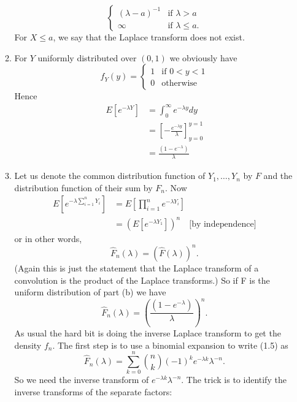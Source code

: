 \documentclass[11pt,a4paper]{article}
\begin{document}
\begin{enumerate}
\begin{enumerate}
$$\begin{cases}
        (\lambda - a)^{-1} & \text{if $\lambda > a$}\\
        \infty & \text{if $\lambda \leq a$}.
      \end{cases}
      $$
      For $X \leq a$, we say that the Laplace transform does not exist.
      \item For $Y$ uniformly distributed over $(0, 1)$ we obviously have
      \begin{equation}\tag{1.4}
        f_Y(y) =
        \begin{cases}
          1 & \text{if $0 < y < 1$}\\
          0 & \text{otherwise}
        \end{cases}
      \end{equation}
      Hence
      \begin{align*}
        E[e^{-\lambda Y}]
        &= \int_0^\infty e^{-\lambda y}dy\\
        &= \left[-\frac{e^{-\lambda y}}{\lambda}\right]^{y = 1}_{y = 0}\\
        &= \frac{(1 - e^{-\lambda})}{\lambda}
      \end{align*}
      \item Let us denote the common distribution function of $Y_1, \ldots, Y_n$ by $F$ and the distribution
      function of their sum by $F_n$. Now
      \begin{align*}
        E\left[e^{-\lambda\sum_{i=1}^nY_i}\right]
        &= E\left[\prod_{i = 1}^ne^{-\lambda Y_i}\right]\\
        &= \left(E[e^{-\lambda Y_1}]\right)^n \quad\text{[by independence]}
      \end{align*}
      or in other words,
      $$
      \hat{F}_n(\lambda) = (\hat{F}(\lambda))^n.
      $$
      (Again this is just the statement that the Laplace transform of a convolution is the product of the Laplace transforms.) So if F is the uniform distribution of part (b) we have
      \begin{equation}\tag{1.5}
        \hat{F}_n(\lambda) = \left(\frac{(1 - e^{-\lambda})}{\lambda}\right)^n.
      \end{equation}
      As usual the hard bit is doing the inverse Laplace transform to get the density $f_n$. The first step is to use a binomial expansion to write (1.5) as
      $$
      \hat{F}_n(\lambda) = \sum_{k = 0}^n\binom{n}{k}(-1)^ke^{-\lambda k}\lambda^{-n}.
      $$
      So we need the inverse transform of $e^{-\lambda k}\lambda^{-n}$. The trick is to identify the inverse transforms of the separate factors:

\end{enumerate}
\end{enumerate}
\end{document}
